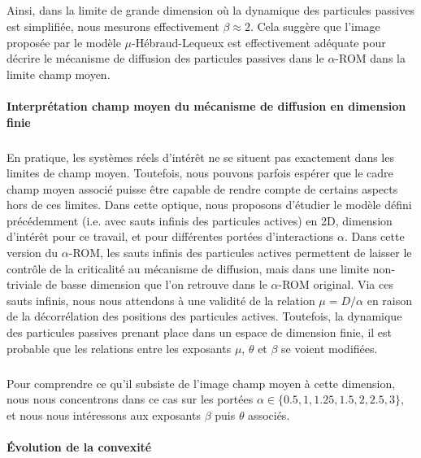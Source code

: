 \subparagraph{}Ainsi, dans la limite de grande dimension où la dynamique des particules passives est simplifiée, nous mesurons effectivement $\beta \approx 2$. Cela suggère que l'image proposée par le modèle $\mu$-Hébraud-Lequeux est effectivement adéquate pour décrire le mécanisme de diffusion des particules passives dans le $\alpha$-ROM dans la limite champ moyen.

\paragraph{Interprétation champ moyen du mécanisme de diffusion en dimension finie}

\subparagraph{}En pratique, les systèmes réels d'intérêt ne se situent pas exactement dans les limites de champ moyen. Toutefois, nous pouvons parfois espérer que le cadre champ moyen associé puisse être capable de rendre compte de certains aspects hors de ces limites. Dans cette optique, nous proposons d'étudier le modèle défini précédemment (i.e. avec sauts infinis des particules actives) en 2D, dimension d'intérêt pour ce travail, et pour différentes portées d'interactions $\alpha$. Dans cette version du $\alpha$-ROM, les sauts infinis des particules actives permettent de laisser le contrôle de la criticalité au mécanisme de diffusion, mais dans une limite non-triviale de basse dimension que l'on retrouve dans le $\alpha$-ROM original. Via ces sauts infinis, nous nous attendons à une validité de la relation $\mu = D/\alpha$ en raison de la décorrélation des positions des particules actives. Toutefois, la dynamique des particules passives prenant place dans un espace de dimension finie, il est probable que les relations entre les exposants $\mu$, $\theta$ et $\beta$ se voient modifiées. 

\subparagraph{}Pour comprendre ce qu'il subsiste de l'image champ moyen à cette dimension, nous nous concentrons dans ce cas sur les portées $\alpha \in \{ 0.5, 1, 1.25, 1.5, 2, 2.5, 3 \}$, et nous nous intéressons aux exposants $\beta$ puis $\theta$ associés.

\paragraph{Évolution de la convexité}

\label{sec:sautsinfinis}

